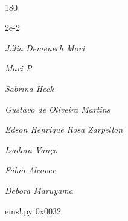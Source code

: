 \documentclass[12pt]{article}
\begin{document}

\pagebreak			

	\ 
	\vfill
	\begin{turn}{180}	
		\begin{minipage}{\textwidth}
		  	\ttfamily %
			\centering
			{\Huge 2e-2}
		  
			\hfill
		  
			

\textit{\small Júlia Demenech Mori}

\textit{\small Mari P}

\textit{\small Sabrina Heck}

\textit{\small Gustavo de Oliveira Martins}

\textit{\small Edson Henrique Rosa Zarpellon}

\textit{\small Isadora Vanço}

\textit{\small Fábio Alcover}

\textit{\small Debora Maruyama}

\bigskip

eins!.py
0x0032


		\end{minipage}	
	\end{turn}
	\vfill
	\

\pagebreak
\end{document}
